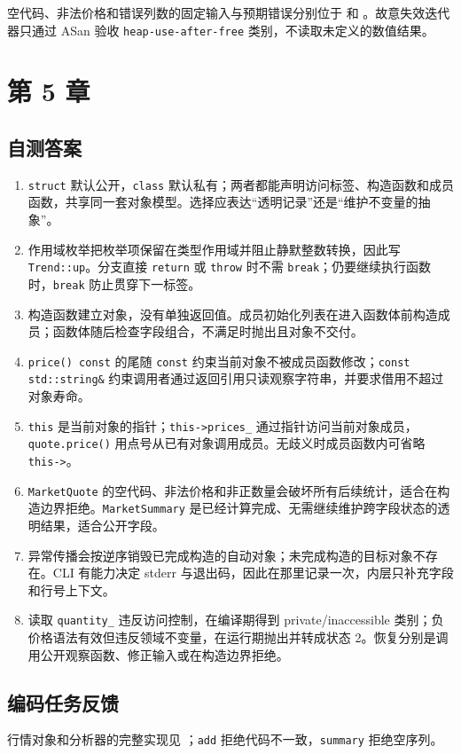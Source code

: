 空代码、非法价格和错误列数的固定输入与预期错误分别位于  和 。故意失效迭代器只通过 ASan 验收 \texttt{heap-use-after-free} 类别，不读取未定义的数值结果。

\section{第 5 章}
\subsection*{自测答案}
\begin{enumerate}
  \item \texttt{struct} 默认公开，\texttt{class} 默认私有；两者都能声明访问标签、构造函数和成员函数，共享同一套对象模型。选择应表达“透明记录”还是“维护不变量的抽象”。
  \item 作用域枚举把枚举项保留在类型作用域并阻止静默整数转换，因此写 \texttt{Trend::up}。分支直接 \texttt{return} 或 \texttt{throw} 时不需 \texttt{break}；仍要继续执行函数时，\texttt{break} 防止贯穿下一标签。
  \item 构造函数建立对象，没有单独返回值。成员初始化列表在进入函数体前构造成员；函数体随后检查字段组合，不满足时抛出且对象不交付。
  \item \texttt{price() const} 的尾随 \texttt{const} 约束当前对象不被成员函数修改；\texttt{const std::string\&} 约束调用者通过返回引用只读观察字符串，并要求借用不超过对象寿命。
  \item \texttt{this} 是当前对象的指针；\texttt{this->prices\_} 通过指针访问当前对象成员，\texttt{quote.price()} 用点号从已有对象调用成员。无歧义时成员函数内可省略 \texttt{this->}。
  \item \texttt{MarketQuote} 的空代码、非法价格和非正数量会破坏所有后续统计，适合在构造边界拒绝。\texttt{MarketSummary} 是已经计算完成、无需继续维护跨字段状态的透明结果，适合公开字段。
  \item 异常传播会按逆序销毁已完成构造的自动对象；未完成构造的目标对象不存在。CLI 有能力决定 stderr 与退出码，因此在那里记录一次，内层只补充字段和行号上下文。
  \item 读取 \texttt{quantity\_} 违反访问控制，在编译期得到 private/inaccessible 类别；负价格语法有效但违反领域不变量，在运行期抛出并转成状态 2。恢复分别是调用公开观察函数、修正输入或在构造边界拒绝。
\end{enumerate}

\subsection*{编码任务反馈}
行情对象和分析器的完整实现见 ；\texttt{add} 拒绝代码不一致，\texttt{summary} 拒绝空序列。

